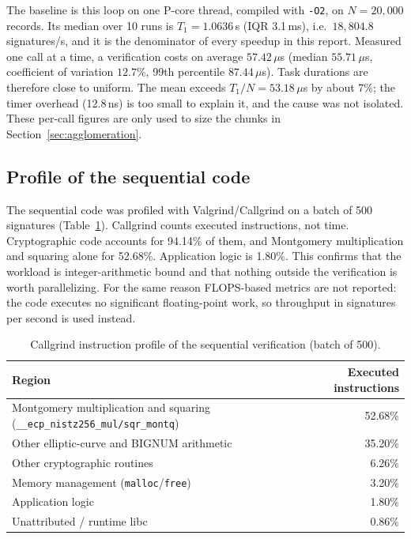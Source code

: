 \documentclass[10pt,a4paper]{article}
\begin{document}
The baseline is this loop on one P-core thread, compiled with \texttt{-O2}, on $N=20{,}000$ records. Its median over 10 runs is $T_1 = 1.0636$\,s (IQR 3.1\,ms), i.e.\ $18{,}804.8$ signatures/s, and it is the denominator of every speedup in this report. Measured one call at a time, a verification costs on average $57.42\,\mu$s (median $55.71\,\mu$s, coefficient of variation $12.7\%$, 99th percentile $87.44\,\mu$s). Task durations are therefore close to uniform. The mean exceeds $T_1/N = 53.18\,\mu$s by about 7\%; the timer overhead (12.8\,ns) is too small to explain it, and the cause was not isolated. These per-call figures are only used to size the chunks in Section~\ref{sec:agglomeration}.

\subsection{Profile of the sequential code}

The sequential code was profiled with Valgrind/Callgrind on a batch of 500 signatures (Table~\ref{tab:profile}). Callgrind counts executed instructions, not time. Cryptographic code accounts for 94.14\% of them, and Montgomery multiplication and squaring alone for 52.68\%. Application logic is 1.80\%. This confirms that the workload is integer-arithmetic bound and that nothing outside the verification is worth parallelizing. For the same reason FLOPS-based metrics are not reported: the code executes no significant floating-point work, so throughput in signatures per second is used instead.

\begin{table}[t]
\centering\small
\begin{tabular}{lr}
\toprule
\textbf{Region} & \textbf{Executed instructions} \\
\midrule
Montgomery multiplication and squaring (\texttt{\_\_ecp\_nistz256\_mul/sqr\_montq}) & 52.68\% \\
Other elliptic-curve and BIGNUM arithmetic & 35.20\% \\
Other cryptographic routines & 6.26\% \\
Memory management (\texttt{malloc}/\texttt{free}) & 3.20\% \\
Application logic & 1.80\% \\
Unattributed / runtime libc & 0.86\% \\
\bottomrule
\end{tabular}
\caption{Callgrind instruction profile of the sequential verification (batch of 500).}
\label{tab:profile}
\end{table}
\end{document}
